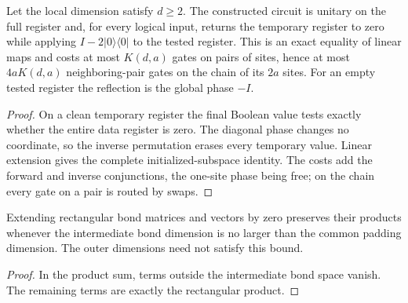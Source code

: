 \begin{lemma}
    \label{thm:mpu_clean_zero_register_reflection}
    \leanok
    Let the local dimension satisfy $d\geq2$.
    The constructed circuit is unitary on the full register and,
    for every logical input, returns the temporary register to zero
    while applying $I-2|0\rangle\langle0|$ to the tested register.
    This is an exact equality of linear maps and costs at most
    $K(d,a)$ gates on pairs of sites, hence at most $4aK(d,a)$
    neighboring-pair gates on the chain of its $2a$ sites. For an
    empty tested register the reflection is the global phase $-I$.
\end{lemma}
\begin{proof}\leanok
    On a clean temporary register the final Boolean value tests
    exactly whether the entire data register is zero. The diagonal
    phase changes no coordinate, so the inverse permutation erases
    every temporary value. Linear extension gives the complete
    initialized-subspace identity. The costs add the forward and
    inverse conjunctions, the one-site phase being free; on the chain
    every gate on a pair is routed by swaps.
\end{proof}

\begin{lemma}
    \label{thm:mpu_padded_bond_products}
    \leanok
    Extending rectangular bond matrices and vectors by zero preserves
    their products whenever the intermediate bond dimension is no
    larger than the common padding dimension. The outer dimensions
    need not satisfy this bound.
\end{lemma}
\begin{proof}\leanok
    In the product sum, terms outside the intermediate bond space
    vanish. The remaining terms are exactly the rectangular product.
\end{proof}

